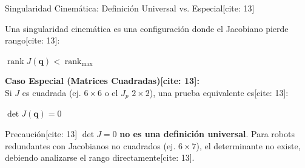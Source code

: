 \documentclass[aspectratio=169, xcolor={table,xcdraw}]{beamer}
\begin{document}
\begin{frame}{Singularidad Cinemática: Definición Universal vs. Especial[cite: 13]}
    \begin{tcolorbox}[colback=white, colframe=ucbblue, title=Definición Universal{[cite: 13]}, boxsep=0mm, top=1mm, bottom=1mm, left=1mm, right=1mm]
        Una singularidad cinemática es una configuración donde el Jacobiano pierde rango[cite: 13]:
        \begin{center}
            $\boxed{\operatorname{rank}J(\mathbf{q}) < \operatorname{rank}_{\max}}$ \text{[cite: 13]}
        \end{center}
    \end{tcolorbox}
    
    \vspace{0.3cm}
    \textbf{Caso Especial (Matrices Cuadradas)[cite: 13]:} \\
    \small Si $J$ es cuadrada (ej. $6 \times 6$ o el $J_p$ $2 \times 2$), una prueba equivalente es[cite: 13]:
    \begin{center}
        $\boxed{\det J(\mathbf{q}) = 0}$ \text{[cite: 13]}
    \end{center}
    
    \vspace{0.3cm}
    \begin{alertblock}{Precaución[cite: 13]}
        \footnotesize $\det J=0$ \textbf{no es una definición universal}. Para robots redundantes con Jacobianos no cuadrados (ej. $6 \times 7$), el determinante no existe, debiendo analizarse el rango directamente[cite: 13].
    \end{alertblock}
\end{frame}
\end{document}
